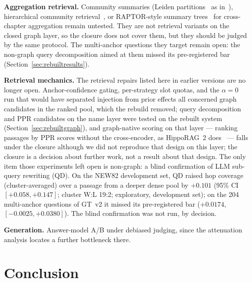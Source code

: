 \textbf{Aggregation retrieval.} Community summaries (Leiden
partitions~\cite{traag2019leiden} as in~\cite{edge2024graphrag}),
hierarchical community retrieval~\cite{wang2025archrag}, or RAPTOR-style
summary trees~\cite{sarthi2024raptor} for cross-chapter aggregation
remain untested. They are not retrieval variants on the closed graph
layer, so the closure does not cover them, but they should be judged by
the same protocol. The multi-anchor questions they target remain open:
the non-graph query decomposition aimed at them missed its
pre-registered bar (Section~\ref{sec:rebuiltresults}).

\textbf{Retrieval mechanics.} The retrieval repairs listed here in
earlier versions are no longer open. Anchor-confidence gating, per-strategy
slot quotas, and the $\alpha=0$ run that would have separated injection
from prior effects all concerned graph candidates in the ranked pool,
which the rebuild removed; query decomposition and PPR candidates on
the name layer were tested on the rebuilt system
(Section~\ref{sec:rebuiltgraph}), and graph-native scoring on that
layer --- ranking passages by PPR scores without the cross-encoder, as
HippoRAG~2 does~\cite{gutierrez2025hipporag2} --- falls under the
closure although we did not reproduce that design on this layer; the
closure is a decision about further work, not a result about that
design. The only item those experiments left
open is non-graph: a blind confirmation of LLM sub-query rewriting
(QD). On the NEW82 development set, QD raised hop coverage (cluster-averaged)
over a passage from a deeper dense pool by $+0.101$ (95\% CI
$[+0.058, +0.147]$; cluster W:L 19:2; exploratory, development set);
on the 204 multi-anchor questions of GT~v2 it missed its
pre-registered bar ($+0.0174$, $[-0.0025, +0.0380]$). The blind
confirmation was not run, by decision.

\textbf{Generation.} Answer-model A/B under debiased judging, since the
attenuation analysis locates a further bottleneck there.

\section{Conclusion}
\label{sec:conclusion}


